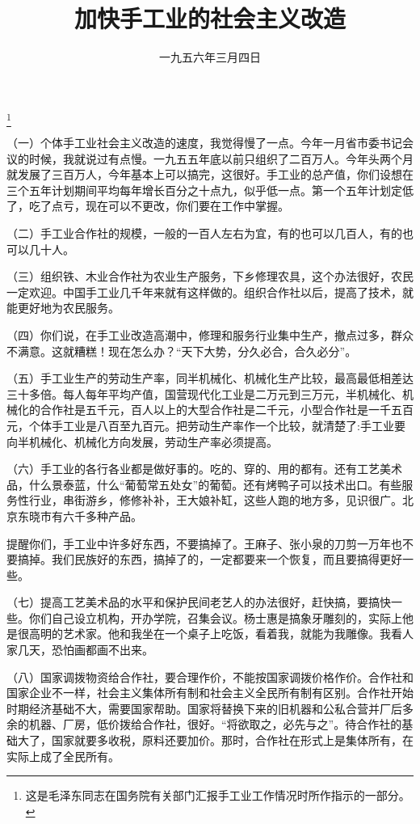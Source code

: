 
\title{加快手工业的社会主义改造}
\date{一九五六年三月四日}
\thanks{这是毛泽东同志在国务院有关部门汇报手工业工作情况时所作指示的一部分。}
\maketitle


（一）个体手工业社会主义改造的速度，我觉得慢了一点。今年一月省市委书记会议的时候，我就说过有点慢。一九五五年底以前只组织了二百万人。今年头两个月就发展了三百万人，今年基本上可以搞完，这很好。手工业的总产值，你们设想在三个五年计划期间平均每年增长百分之十点九，似乎低一点。第一个五年计划定低了，吃了点亏，现在可以不更改，你们要在工作中掌握。

（二）手工业合作社的规模，一般的一百人左右为宜，有的也可以几百人，有的也可以几十人。

（三）组织铁、木业合作社为农业生产服务，下乡修理农具，这个办法很好，农民一定欢迎。中国手工业几千年来就有这样做的。组织合作社以后，提高了技术，就能更好地为农民服务。

（四）你们说，在手工业改造高潮中，修理和服务行业集中生产，撤点过多，群众不满意。这就糟糕！现在怎么办？“天下大势，分久必合，合久必分”。

（五）手工业生产的劳动生产率，同半机械化、机械化生产比较，最高最低相差达三十多倍。每人每年平均产值，国营现代化工业是二万元到三万元，半机械化、机械化的合作社是五千元，百人以上的大型合作社是二千元，小型合作社是一千五百元，个体手工业是八百至九百元。把劳动生产率作一个比较，就清楚了:手工业要向半机械化、机械化方向发展，劳动生产率必须提高。

（六）手工业的各行各业都是做好事的。吃的、穿的、用的都有。还有工艺美术品，什么景泰蓝，什么“葡萄常五处女”的葡萄。还有烤鸭子可以技术出口。有些服务性行业，串街游乡，修修补补，王大娘补缸，这些人跑的地方多，见识很广。北京东晓市有六千多种产品。

提醒你们，手工业中许多好东西，不要搞掉了。王麻子、张小泉的刀剪一万年也不要搞掉。我们民族好的东西，搞掉了的，一定都要来一个恢复，而且要搞得更好一些。

（七）提高工艺美术品的水平和保护民间老艺人的办法很好，赶快搞，要搞快一些。你们自己设立机构，开办学院，召集会议。杨士惠是搞象牙雕刻的，实际上他是很高明的艺术家。他和我坐在一个桌子上吃饭，看着我，就能为我雕像。我看人家几天，恐怕画都画不出来。

（八）国家调拨物资给合作社，要合理作价，不能按国家调拨价格作价。合作社和国家企业不一样，社会主义集体所有制和社会主义全民所有制有区别。合作社开始时期经济基础不大，需要国家帮助。国家将替换下来的旧机器和公私合营并厂后多余的机器、厂房，低价拨给合作社，很好。“将欲取之，必先与之”。待合作社的基础大了，国家就要多收税，原料还要加价。那时，合作社在形式上是集体所有，在实际上成了全民所有。

